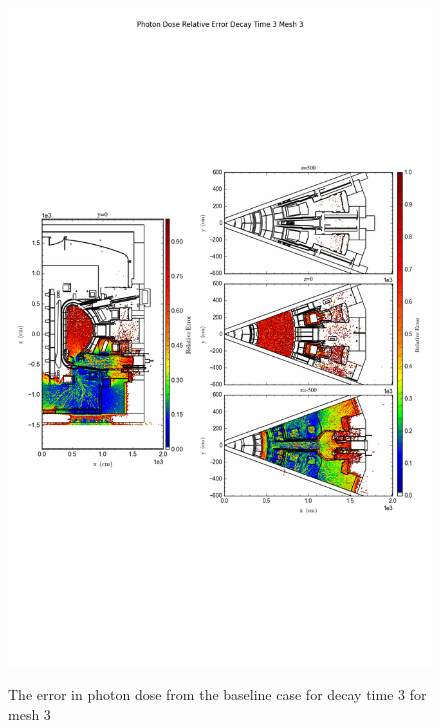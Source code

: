 \begin{figure}[ht!]
\centering
\includegraphics[trim={0cm 9cm 0cm 10cm},clip,scale=0.75]{../plots/final_model/Photon_Dose_Relative_Error_Decay_Time_3_Mesh_3.png}
\label{fig:photons_dc3_no4bc_m3_error}
\caption{The error in photon dose from the baseline case for decay time 3 for mesh 3}
\end{figure}
